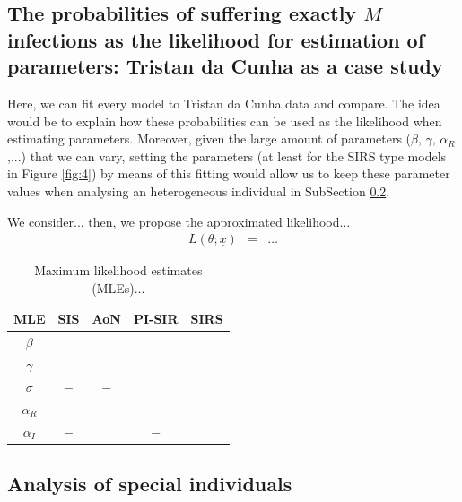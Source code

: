 \documentclass[preprint,12pt]{elsarticle}
\begin{document}
\subsection{The probabilities of suffering exactly $M$ infections as the likelihood for estimation of parameters: Tristan da Cunha as a case study}
\label{SubSect32}

\par Here, we can fit every model to Tristan da Cunha data and compare. The idea would be to explain how these probabilities can be used as the likelihood when estimating parameters. Moreover, given the large amount of parameters ($\beta$, $\gamma$, $\alpha_R$,...) that we can vary, setting the parameters (at least for the SIRS type models in Figure \ref{fig:4}) by means of this fitting would allow us to keep these parameter values when analysing an heterogeneous individual in SubSection \ref{SubSect33}.

\par We consider... then, we propose the approximated likelihood...
\begin{eqnarray*}
L(\theta;{\underline x}) &=& \dots
\end{eqnarray*}

\begin{table}[h!]
{\small
\centering
\begin{tabular}{|c|c|c|c|c|}
\hline
MLE & SIS & AoN & PI-SIR & SIRS\\
\hline
$\beta$ & & & & \\
\hline
$\gamma$ & & & & \\
\hline
$\sigma$ & $-$ & $-$ & & \\
\hline
$\alpha_R$ & $-$ & & $-$ & \\
\hline
$\alpha_I$ & $-$ & & $-$ & \\
\hline
\end{tabular}
\caption{Maximum likelihood estimates (MLEs)...}
\label{tab:tristan}}
\end{table}


\subsection{Analysis of special individuals}
\label{SubSect33}
\end{document}
